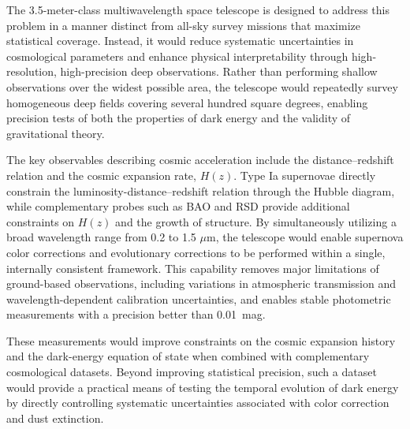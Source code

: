 The 3.5-meter-class multiwavelength space telescope is designed to address this problem in a manner distinct from all-sky survey missions that maximize statistical coverage. Instead, it would reduce systematic uncertainties in cosmological parameters and enhance physical interpretability through high-resolution, high-precision deep observations. Rather than performing shallow observations over the widest possible area, the telescope would repeatedly survey homogeneous deep fields covering several hundred square degrees, enabling precision tests of both the properties of dark energy and the validity of gravitational theory.

The key observables describing cosmic acceleration include the distance--redshift relation and the cosmic expansion rate, $H(z)$. Type Ia supernovae directly constrain the luminosity-distance--redshift relation through the Hubble diagram, while complementary probes such as BAO and RSD provide additional constraints on $H(z)$ and the growth of structure. By simultaneously utilizing a broad wavelength range from 0.2 to 1.5 $\mu$m, the telescope would enable supernova color corrections and evolutionary corrections to be performed within a single, internally consistent framework. This capability removes major limitations of ground-based observations, including variations in atmospheric transmission and wavelength-dependent calibration uncertainties, and enables stable photometric measurements with a precision better than 0.01~mag.

These measurements would improve constraints on the cosmic expansion history and the dark-energy equation of state when combined with complementary cosmological datasets.
Beyond improving statistical precision, such a dataset would provide a practical means of testing the temporal evolution of dark energy by directly controlling systematic uncertainties associated with color correction and dust extinction.

